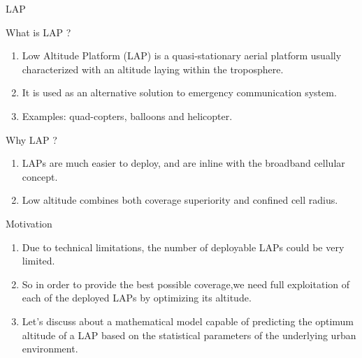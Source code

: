 \documentclass{beamer}
\begin{document}
\begin{frame}{LAP}

\begin{block}{What is LAP ?}
\begin{enumerate}
    \item Low Altitude Platform (LAP) is a quasi-stationary aerial platform usually characterized with an altitude laying within the troposphere.
    \item It is used as an alternative solution to emergency communication system.
    \item Examples: quad-copters, balloons and helicopter.
\end{enumerate}
\end{block}

\begin{block}{Why LAP ?}
\begin{enumerate}
    \item LAPs are much easier to deploy, and are inline with the broadband cellular concept.
    \item Low altitude combines both coverage superiority and confined cell radius.
\end{enumerate}
\end{block}

\end{frame}

\begin{frame}{Motivation}

\begin{enumerate}
    \item Due to technical limitations, the number of deployable LAPs could be very limited.
    \item So in order to provide the best possible coverage,we need  full exploitation of each of the deployed LAPs by optimizing its altitude.
    \item Let’s discuss about a mathematical model capable of predicting the optimum altitude of a LAP based on the statistical parameters of the underlying urban environment.
\end{enumerate}

\end{frame}
\end{document}
